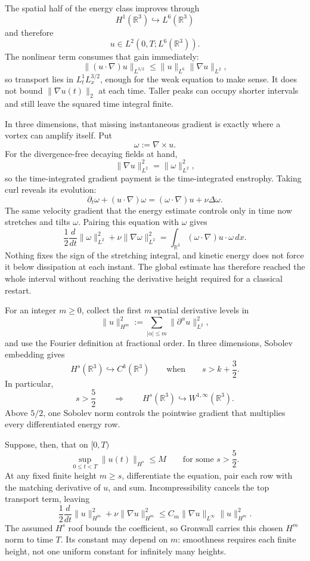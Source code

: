 The spatial half of the energy class improves through
\[
  H^1(\mathbb R^3)\hookrightarrow L^6(\mathbb R^3)
\]
and therefore
\[
  u\in L^2(0,T;L^6(\mathbb R^3)).
\]
The nonlinear term consumes that gain immediately:
\[
  \lVert(u\cdot\nabla)u\rVert_{L^{3/2}}
  \leq
  \lVert u\rVert_{L^6}
  \lVert\nabla u\rVert_{L^2},
\]
so transport lies in \(L^1_tL^{3/2}_x\), enough for the weak equation to make
sense.  It does not bound \(\lVert\nabla u(t)\rVert_2\) at each time.  Taller
peaks can occupy shorter intervals and still leave the squared time integral
finite.

In three dimensions, that missing instantaneous gradient is exactly where a
vortex can amplify itself.  Put
\[
  \omega:=\nabla\times u.
\]
For the divergence-free decaying fields at hand,
\[
  \lVert\nabla u\rVert_{L^2}^2
  =
  \lVert\omega\rVert_{L^2}^2,
\]
so the time-integrated gradient payment is the time-integrated enstrophy.
Taking curl reveals its evolution:
\[
  \partial_t\omega+(u\cdot\nabla)\omega
  =
  (\omega\cdot\nabla)u+\nu\Delta\omega.
\]
The same velocity gradient that the energy estimate controls only in time now
stretches and tilts \(\omega\).  Pairing this equation with \(\omega\) gives
\[
  \frac12\frac{d}{dt}\lVert\omega\rVert_{L^2}^2
  +
  \nu\lVert\nabla\omega\rVert_{L^2}^2
  =
  \int_{\mathbb R^3}(\omega\cdot\nabla)u\cdot\omega\,dx.
\]
Nothing fixes the sign of the stretching integral, and kinetic energy does not
force it below dissipation at each instant.  The global estimate has therefore
reached the whole interval without reaching the derivative height required for
a classical restart.


For an integer \(m\geq0\), collect the first \(m\) spatial derivative levels in
\[
  \lVert u\rVert_{H^m}^2
  :=
  \sum_{|\alpha|\leq m}
  \lVert\partial^\alpha u\rVert_{L^2}^2,
\]
and use the Fourier definition at fractional order.  In three dimensions,
Sobolev embedding gives \parencite[Theorem~7.28]{Cerda2010}
\[
  H^s(\mathbb R^3)\hookrightarrow C^k(\mathbb R^3)
  \qquad
  \text{when}
  \qquad
  s>k+\frac32.
\]
In particular,
\[
  s>\frac52
  \qquad\Longrightarrow\qquad
  H^s(\mathbb R^3)\hookrightarrow W^{1,\infty}(\mathbb R^3).
\]
Above \(5/2\), one Sobolev norm controls the pointwise gradient that multiplies
every differentiated energy row.

Suppose, then, that on \([0,T)\)
\[
  \sup_{0\leq t<T}\lVert u(t)\rVert_{H^s}
  \leq M
  \qquad
  \text{for some }s>\frac52.
\]
At any fixed finite height \(m\geq s\), differentiate the equation, pair each
row with the matching derivative of \(u\), and sum.  Incompressibility cancels
the top transport term, leaving
\[
  \frac12\frac{d}{dt}\lVert u\rVert_{H^m}^2
  +
  \nu\lVert\nabla u\rVert_{H^m}^2
  \leq
  C_m\lVert\nabla u\rVert_{L^\infty}
  \lVert u\rVert_{H^m}^2.
\]
The assumed \(H^s\) roof bounds the coefficient, so Gronwall carries this
chosen \(H^m\) norm to time \(T\).  Its constant may depend on \(m\): smoothness
requires each finite height, not one uniform constant for infinitely many
heights.

